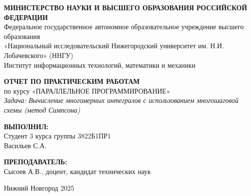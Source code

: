 \documentclass[14pt,a4paper]{extarticle}
\begin{document}
\begin{titlepage}
\begin{center}

\onehalfspacing

\begin{center}
    \textbf{МИНИСТЕРСТВО НАУКИ И ВЫСШЕГО ОБРАЗОВАНИЯ РОССИЙСКОЙ ФЕДЕРАЦИИ} \\
    Федеральное государственное автономное образовательное учреждение высшего образования \\
    «Национальный исследовательский Нижегородский университет им. Н.И. Лобачевского» (ННГУ) \\
    Институт информационных технологий, математики и механики
\end{center}

\vspace{4cm}

\begin{center}
    \textbf{ОТЧЕТ ПО ПРАКТИЧЕСКИМ РАБОТАМ} \vspace{0.5cm}\\
    по курсу «ПАРАЛЛЕЛЬНОЕ ПРОГРАММИРОВАНИЕ» \vspace{0.5cm}\\
    \textit{Задача: Вычисление многомерных интегралов с использованием многошаговой схемы (метод Симпсона)}
\end{center}

\vspace{4cm}

\begin{flushright}
    \textbf{ВЫПОЛНИЛ:} \\ 
    Студент 3 курса 
    группы 3822Б1ПР1 \\ 
    Васильев С.А. \\

    \vspace{1cm}

    \textbf{ПРЕПОДАВАТЕЛЬ:} \\ 
    Сысоев А.В., доцент, кандидат технических наук \\ 
\end{flushright}

\vspace{1cm}

\begin{center}
    Нижний Новгород 2025\newpage
\end{center}

\end{center}
\end{titlepage}
\end{document}
